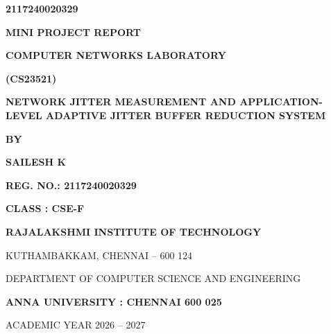 \documentclass[12pt, a4paper]{report}
\begin{document}
\begin{titlepage}
    \thispagestyle{empty}
    \centering
    \vspace*{0.2cm}
    
    {\large\bfseries 2117240020329\par}
    
    \vspace{1.2cm}
    
    {\LARGE\bfseries MINI PROJECT REPORT\par}
    \vspace{0.4cm}
    {\Large\bfseries COMPUTER NETWORKS LABORATORY\par}
    \vspace{0.2cm}
    {\large\bfseries (CS23521)\par}
    
    \vspace{1.2cm}
    
    {\LARGE\bfseries NETWORK JITTER MEASUREMENT AND APPLICATION-LEVEL ADAPTIVE JITTER BUFFER REDUCTION SYSTEM\par}
    
    \vspace{1.6cm}
    
    {\large\bfseries BY\par}
    \vspace{0.3cm}
    {\textbf{\Large SAILESH K}\par}
    \vspace{0.2cm}
    {\textbf{\large REG. NO.: 2117240020329}\par}
    \vspace{0.2cm}
    {\textbf{\large CLASS : CSE-F}\par}
    
    \vfill
    
    {\large\bfseries RAJALAKSHMI INSTITUTE OF TECHNOLOGY\par}
    \vspace{0.15cm}
    {\normalsize KUTHAMBAKKAM, CHENNAI -- 600 124\par}
    \vspace{0.15cm}
    {\normalsize DEPARTMENT OF COMPUTER SCIENCE AND ENGINEERING\par}
    \vspace{0.15cm}
    {\large\bfseries ANNA UNIVERSITY : CHENNAI 600 025\par}
    \vspace{0.15cm}
    {\normalsize ACADEMIC YEAR 2026 -- 2027\par}
    \vspace*{0.3cm}
\end{titlepage}
\end{document}
